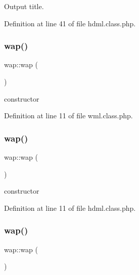 Output title. 



Definition at line 41 of file hdml.\+class.\+php.

\hypertarget{classwap_a7b4befeef8257c63a0ffe3012a84560b}{}\label{classwap_a7b4befeef8257c63a0ffe3012a84560b} 
\subsubsection{\texorpdfstring{wap()}{wap()}\hspace{0.1cm}{\footnotesize\ttfamily [1/3]}}
{\footnotesize\ttfamily wap\+::wap (\begin{DoxyParamCaption}{ }\end{DoxyParamCaption})}



constructor 



Definition at line 11 of file wml.\+class.\+php.

\hypertarget{classwap_a7b4befeef8257c63a0ffe3012a84560b}{}\label{classwap_a7b4befeef8257c63a0ffe3012a84560b} 
\subsubsection{\texorpdfstring{wap()}{wap()}\hspace{0.1cm}{\footnotesize\ttfamily [2/3]}}
{\footnotesize\ttfamily wap\+::wap (\begin{DoxyParamCaption}{ }\end{DoxyParamCaption})}



constructor 



Definition at line 11 of file hdml.\+class.\+php.

\hypertarget{classwap_a7b4befeef8257c63a0ffe3012a84560b}{}\label{classwap_a7b4befeef8257c63a0ffe3012a84560b} 
\subsubsection{\texorpdfstring{wap()}{wap()}\hspace{0.1cm}{\footnotesize\ttfamily [3/3]}}
{\footnotesize\ttfamily wap\+::wap (\begin{DoxyParamCaption}{ }\end{DoxyParamCaption})}



